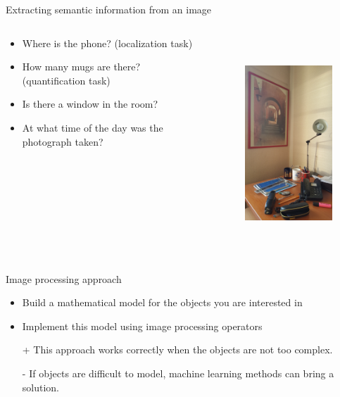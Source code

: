 \documentclass[xcolor=pdftex,dvipsnames,table,mathserif]{beamer}
\begin{document}
\begin{frame}{Extracting semantic information from an image}

\begin{columns}
  \begin{column}{.5\textwidth}
\begin{itemize}
\item Where is the phone? (localization task)
\item How many mugs are there? (quantification task)
\item Is there a window in the room?
\item At what time of the day was the photograph taken?
\end{itemize}
  \end{column}

  \begin{column}{.5\textwidth}
    \begin{figure}[ht]
      \centering
      \includegraphics[height=8cm]{bureau-1}
    \end{figure}

  \end{column}
\end{columns}

\end{frame}


\begin{frame}{Image processing approach}

  \begin{block}{}
    \begin{itemize}
    \item Build a mathematical model for the objects you are interested in
    \item Implement this model using image processing operators
    \end{itemize}
  \end{block}

\begin{itemize}
\item[+] This approach works correctly when the objects are not too complex.
\item[-] If objects are difficult to model, machine learning methods can bring a solution.
\end{itemize}


\end{frame}
\end{document}
